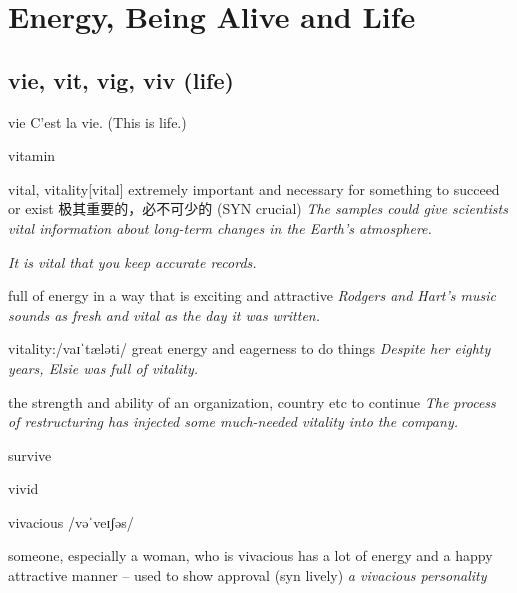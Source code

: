 \chapter{Energy, Being Alive and Life}

\section{vie, vit, vig, viv (life)}

\begin{DefWord}{vie}
    C'est la vie. (This is life.)
\end{DefWord}

\begin{DefWord}{vitamin}
\end{DefWord}

\begin{DefWord}{vital, vitality}[vital]
    extremely important and necessary for something to succeed or exist 极其重要的，必不可少的 (SYN  crucial)
    \textit{The samples could give scientists vital information about long-term changes in the Earth’s atmosphere.}

    \textit{It is vital that you keep accurate records.}

    full of energy in a way that is exciting and attractive
    \textit{Rodgers and Hart’s music sounds as fresh and vital as the day it was written.}

    vitality:/vaɪˈtæləti/
    great energy and eagerness to do things
    \textit{Despite her eighty years, Elsie was full of vitality.}

    the strength and ability of an organization, country etc to continue
    \textit{The process of restructuring has injected some much-needed vitality into the company.}
\end{DefWord}

\begin{DefWord}{survive}
\end{DefWord}

\begin{DefWord}{vivid}
\end{DefWord}

\begin{DefWord}{vivacious}
    /vəˈveɪʃəs/

    someone, especially a woman, who is vivacious has a lot of energy and a happy attractive manner – used to show approval (syn lively)
    \textit{a vivacious personality}
\end{DefWord}

